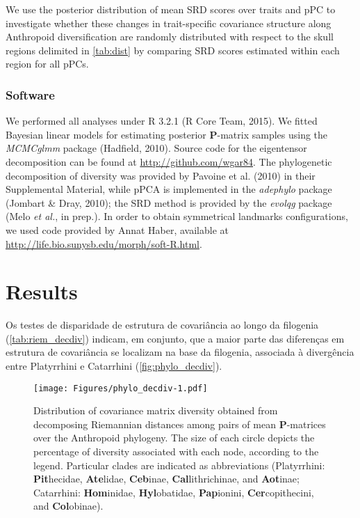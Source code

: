 \documentclass[12pt,twoside]{report}
\begin{document}
We use the posterior distribution of mean SRD scores over traits and pPC
to investigate whether these changes in trait-specific covariance
structure along Anthropoid diversification are randomly distributed with
respect to the skull regions delimited in \autoref{tab:dist} by
comparing SRD scores estimated within each region for all pPCs.

\subsubsection{Software}\label{software-2}

We performed all analyses under R 3.2.1 (R Core Team, 2015). We fitted
Bayesian linear models for estimating posterior $\mathbf{P}$-matrix
samples using the \emph{MCMCglmm} package (Hadfield, 2010). Source code
for the eigentensor decomposition can be found at
\url{http://github.com/wgar84}. The phylogenetic decomposition of
diversity was provided by Pavoine et al. (2010) in their Supplemental
Material, while pPCA is implemented in the \emph{adephylo} package
(Jombart \& Dray, 2010); the SRD method is provided by the \emph{evolqg}
package (Melo \emph{et al.}, in prep.). In order to obtain symmetrical
landmarks configurations, we used code provided by Annat Haber,
available at \url{http://life.bio.sunysb.edu/morph/soft-R.html}.

\section{Results}\label{results-2}

Os testes de disparidade de estrutura de covariância ao longo da
filogenia (\autoref{tab:riem_decdiv}) indicam, em conjunto, que a maior
parte das diferenças em estrutura de covariância se localizam na base da
filogenia, associada à divergência entre Platyrrhini e Catarrhini
(\autoref{fig:phylo_decdiv}).



\begin{figure}[htbp]
\centering
\texttt{[image: Figures/phylo\_decdiv-1.pdf]}
\caption{Distribution of covariance matrix diversity obtained from
decomposing Riemannian distances among pairs of mean
$\mathbf{P}$-matrices over the Anthropoid phylogeny. The size of each
circle depicts the percentage of diversity associated with each node,
according to the legend. Particular clades are indicated as
abbreviations (Platyrrhini: \textbf{Pit}hecidae, \textbf{Ate}lidae,
\textbf{Ceb}inae, \textbf{Cal}lithrichinae, and \textbf{Aot}inae;
Catarrhini: \textbf{Hom}inidae, \textbf{Hyl}obatidae,
\textbf{Pap}ionini, \textbf{Cer}copithecini, and \textbf{Col}obinae).
\label{fig:phylo_decdiv}}
\end{figure}
\end{document}
